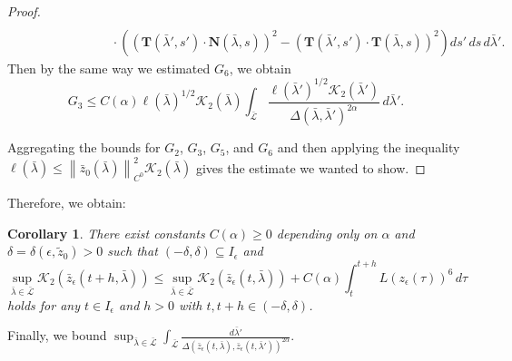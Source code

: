 \documentclass[reqno,centertags,12pt]{amsart}
\newtheorem{corollary}[theorem]{Corollary}
\theoremstyle{definition}
\numberwithin{equation}{section}
\newcommand{\norm}[1]{\left\|#1\right\|}
\begin{document}
\begin{proof}
\begin{align*}
        \\&\quad\quad\quad\quad\quad\quad\quad
        \cdot
        \left(
            (\mathbf{T}(\bar{\lambda}',s')\cdot\mathbf{N}(\bar{\lambda},s))^{2}
            - (\mathbf{T}(\bar{\lambda}',s')\cdot\mathbf{T}(\bar{\lambda},s))^{2}
        \right)
        ds'\,ds\,d\bar{\lambda}'.
    \end{align*}
    Then by the same way we estimated $G_{6}$, we obtain
    \[
        G_{3} \leq C(\alpha)
        \ell(\bar{\lambda})^{1/2}\mathcal{K}_{2}(\bar{\lambda})
        \int_{\bar{\mathcal{L}}}
        \frac{\ell(\bar{\lambda}')^{1/2}\mathcal{K}_{2}(\bar{\lambda}')}
        {\Delta(\bar{\lambda},\bar{\lambda}')^{2\alpha}}
        \,d\bar{\lambda}'.
    \]

    Aggregating the bounds for $G_{2}$, $G_{3}$, $G_{5}$, and $G_{6}$
    and then applying the inequality
    $\ell(\bar{\lambda}) \leq \norm{\bar{z}_{0}(\bar{\lambda})}_{C^{0}}^{2}
    \mathcal{K}_{2}(\bar{\lambda})$ gives the estimate we wanted to show.
\end{proof}

Therefore, we obtain:

\begin{corollary}\label{C6.10}
    There exist constants $C(\alpha)\geq 0$ depending only on $\alpha$
    and $\delta=\delta(\epsilon,\tilde{z}_{0})>0$ such that
    $(-\delta,\delta)\subseteq I_{\epsilon}$ and
    \[
        \sup_{\bar{\lambda}\in\bar{\mathcal{L}}}
        \mathcal{K}_{2}(\bar{z}_{\epsilon}(t+h,\bar{\lambda}))
        \leq
        \sup_{\bar{\lambda}\in\bar{\mathcal{L}}}
        \mathcal{K}_{2}(\bar{z}_{\epsilon}(t,\bar{\lambda}))
        + C(\alpha)
        \int_{t}^{t+h}L(z_{\epsilon}(\tau))^{6}\,d\tau
    \]
    holds for any $t\in I_{\epsilon}$ and $h>0$ with $t,t+h\in(-\delta,\delta)$.
\end{corollary}

Finally, we bound $\sup_{\bar{\lambda}\in\bar{\mathcal{L}}}
\int_{\bar{\mathcal{L}}}\frac{d\bar{\lambda}'}
{\Delta(\bar{z}_{\epsilon}(t,\bar{\lambda}),
\bar{z}_{\epsilon}(t,\bar{\lambda}'))^{2\alpha}}$.
\end{document}
